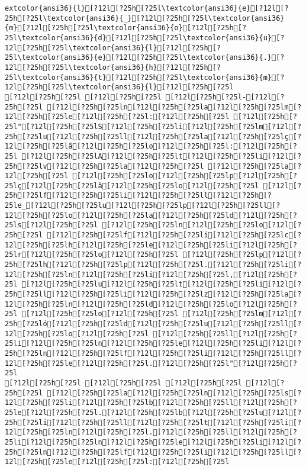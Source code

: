 \documentclass{scrartcl}
\begin{document}
\begin{Verbatim}
extcolor{ansi36}{l}[?12l[?25h[?25l\textcolor{ansi36}{e}[?12l[?25h[?25l\textcolor{ansi36}{_}[?12l[?25h[?25l\textcolor{ansi36}{m}[?12l[?25h[?25l\textcolor{ansi36}{o}[?12l[?25h[?25l\textcolor{ansi36}{d}[?12l[?25h[?25l\textcolor{ansi36}{u}[?12l[?25h[?25l\textcolor{ansi36}{l}[?12l[?25h[?25l\textcolor{ansi36}{e}[?12l[?25h[?25l\textcolor{ansi36}{.}[?12l[?25h[?25l\textcolor{ansi36}{h}[?12l[?25h[?25l\textcolor{ansi36}{t}[?12l[?25h[?25l\textcolor{ansi36}{m}[?12l[?25h[?25l\textcolor{ansi36}{l}[?12l[?25h[?25l
[?12l[?25h[?25l [?12l[?25h[?25l [?12l[?25h[?25l-[?12l[?25h[?25l [?12l[?25h[?25ln[?12l[?25h[?25la[?12l[?25h[?25lm[?12l[?25h[?25le[?12l[?25h[?25l:[?12l[?25h[?25l [?12l[?25h[?25l"[?12l[?25h[?25lS[?12l[?25h[?25li[?12l[?25h[?25lm[?12l[?25h[?25lu[?12l[?25h[?25ll[?12l[?25h[?25la[?12l[?25h[?25lç[?12l[?25h[?25lã[?12l[?25h[?25lo[?12l[?25h[?25l:[?12l[?25h[?25l [?12l[?25h[?25lA[?12l[?25h[?25lt[?12l[?25h[?25li[?12l[?25h[?25lv[?12l[?25h[?25la[?12l[?25h[?25l [?12l[?25h[?25la[?12l[?25h[?25l [?12l[?25h[?25lo[?12l[?25h[?25lp[?12l[?25h[?25lç[?12l[?25h[?25lã[?12l[?25h[?25lo[?12l[?25h[?25l [?12l[?25h[?25lf[?12l[?25h[?25li[?12l[?25h[?25ll[?12l[?25h[?25le_[?12l[?25h[?25lu[?12l[?25h[?25lp[?12l[?25h[?25ll[?12l[?25h[?25lo[?12l[?25h[?25la[?12l[?25h[?25ld[?12l[?25h[?25ls[?12l[?25h[?25l [?12l[?25h[?25ln[?12l[?25h[?25lo[?12l[?25h[?25l [?12l[?25h[?25lf[?12l[?25h[?25li[?12l[?25h[?25lc[?12l[?25h[?25lh[?12l[?25h[?25le[?12l[?25h[?25li[?12l[?25h[?25lr[?12l[?25h[?25lo[?12l[?25h[?25l [?12l[?25h[?25lp[?12l[?25h[?25lh[?12l[?25h[?25lp[?12l[?25h[?25l.[?12l[?25h[?25li[?12l[?25h[?25ln[?12l[?25h[?25li[?12l[?25h[?25l,[?12l[?25h[?25l [?12l[?25h[?25lu[?12l[?25h[?25lt[?12l[?25h[?25li[?12l[?25h[?25ll[?12l[?25h[?25li[?12l[?25h[?25lz[?12l[?25h[?25la[?12l[?25h[?25ln[?12l[?25h[?25ld[?12l[?25h[?25lo[?12l[?25h[?25l [?12l[?25h[?25lo[?12l[?25h[?25l [?12l[?25h[?25lm[?12l[?25h[?25ló[?12l[?25h[?25ld[?12l[?25h[?25lu[?12l[?25h[?25ll[?12l[?25h[?25lo[?12l[?25h[?25l [?12l[?25h[?25ll[?12l[?25h[?25li[?12l[?25h[?25ln[?12l[?25h[?25le[?12l[?25h[?25li[?12l[?25h[?25ln[?12l[?25h[?25lf[?12l[?25h[?25li[?12l[?25h[?25ll[?12l[?25h[?25le[?12l[?25h[?25l.[?12l[?25h[?25l"[?12l[?25h[?25l
[?12l[?25h[?25l [?12l[?25h[?25l [?12l[?25h[?25l [?12l[?25h[?25l [?12l[?25h[?25la[?12l[?25h[?25ln[?12l[?25h[?25ls[?12l[?25h[?25li[?12l[?25h[?25lb[?12l[?25h[?25ll[?12l[?25h[?25le[?12l[?25h[?25l.[?12l[?25h[?25lb[?12l[?25h[?25lu[?12l[?25h[?25li[?12l[?25h[?25ll[?12l[?25h[?25lt[?12l[?25h[?25li[?12l[?25h[?25ln[?12l[?25h[?25l.[?12l[?25h[?25ll[?12l[?25h[?25li[?12l[?25h[?25ln[?12l[?25h[?25le[?12l[?25h[?25li[?12l[?25h[?25ln[?12l[?25h[?25lf[?12l[?25h[?25li[?12l[?25h[?25ll[?12l[?25h[?25le[?12l[?25h[?25l:[?12l[?25h[?25l

\end{Verbatim}
\end{document}
